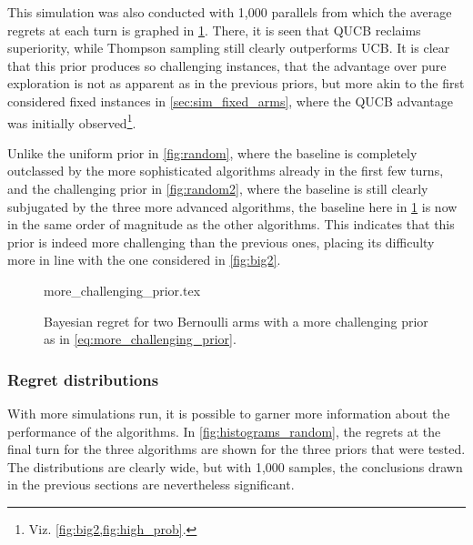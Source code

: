 This simulation was also conducted with 1,000 parallels from which the average regrets at each turn is graphed in \cref{fig:random3}.
There, it is seen that QUCB reclaims superiority, while Thompson sampling still clearly outperforms UCB.
It is clear that this prior produces so challenging instances, that the advantage over pure exploration is not as apparent as in the previous priors, but more akin to the first considered fixed instances in \cref{sec:sim_fixed_arms}, where the QUCB advantage was initially observed\footnote{Viz. \cref{fig:big2,fig:high_prob}.}.

Unlike the uniform prior in \cref{fig:random}, where the baseline is completely outclassed by the more sophisticated algorithms already in the first few turns, and the challenging prior in \cref{fig:random2}, where the baseline is still clearly subjugated by the three more advanced algorithms, the baseline here in \cref{fig:random3} is now in the same order of magnitude as the other algorithms.
This indicates that this prior is indeed more challenging than the previous ones, placing its difficulty more in line with the one considered in \cref{fig:big2}.


\begin{figure}[p]
    \centering
    \newcommand{\myoptions}{
        width=10cm,
        height=8cm,
        xlabel={Kiloturn},
        ylabel={Regret},
        legend entries={Baseline, UCB, QUCB, Thompson},
        legend pos=north west,
        legend cell align=left,
        mystyle,
    }
    {more_challenging_prior.tex}
    \caption[
        Bayesian regret for two Bernoulli arms, more challenging prior.
    ]
    {
        Bayesian regret for two Bernoulli arms with a more challenging prior as in \cref{eq:more_challenging_prior}.
    }
    \label{fig:random3}
\end{figure}

\clearpage

\subsubsection{Regret distributions}
With more simulations run, it is possible to garner more information about the performance of the algorithms.
In \cref{fig:histograms_random}, the regrets at the final turn for the three algorithms are shown for the three priors that were tested.
The distributions are clearly wide, but with 1,000 samples, the conclusions drawn in the previous sections are nevertheless significant.

